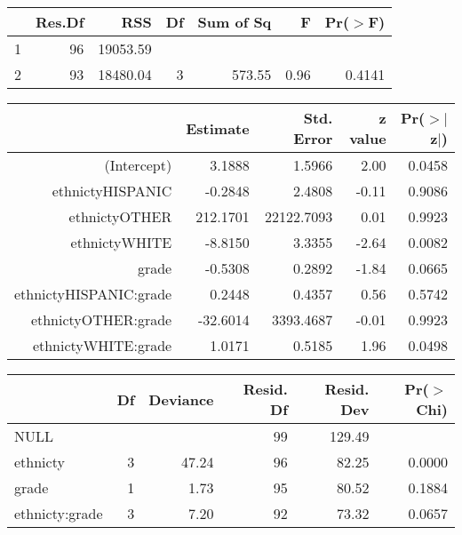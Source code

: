 \begin{table}[ht]
\centering
\begin{tabular}{lrrrrrr}
  \hline
 & Res.Df & RSS & Df & Sum of Sq & F & Pr($>$F) \\ 
  \hline
1 & 96 & 19053.59 &  &  &  &  \\ 
  2 & 93 & 18480.04 & 3 & 573.55 & 0.96 & 0.4141 \\ 
   \hline
\end{tabular}
\end{table}
\begin{table}[ht]
\centering
\begin{tabular}{rrrrr}
  \hline
 & Estimate & Std. Error & z value & Pr($>$$|$z$|$) \\ 
  \hline
(Intercept) & 3.1888 & 1.5966 & 2.00 & 0.0458 \\ 
  ethnictyHISPANIC & -0.2848 & 2.4808 & -0.11 & 0.9086 \\ 
  ethnictyOTHER & 212.1701 & 22122.7093 & 0.01 & 0.9923 \\ 
  ethnictyWHITE & -8.8150 & 3.3355 & -2.64 & 0.0082 \\ 
  grade & -0.5308 & 0.2892 & -1.84 & 0.0665 \\ 
  ethnictyHISPANIC:grade & 0.2448 & 0.4357 & 0.56 & 0.5742 \\ 
  ethnictyOTHER:grade & -32.6014 & 3393.4687 & -0.01 & 0.9923 \\ 
  ethnictyWHITE:grade & 1.0171 & 0.5185 & 1.96 & 0.0498 \\ 
   \hline
\end{tabular}
\end{table}
\begin{table}[ht]
\centering
\begin{tabular}{lrrrrr}
  \hline
 & Df & Deviance & Resid. Df & Resid. Dev & Pr($>$Chi) \\ 
  \hline
NULL &  &  & 99 & 129.49 &  \\ 
  ethnicty & 3 & 47.24 & 96 & 82.25 & 0.0000 \\ 
  grade & 1 & 1.73 & 95 & 80.52 & 0.1884 \\ 
  ethnicty:grade & 3 & 7.20 & 92 & 73.32 & 0.0657 \\ 
   \hline
\end{tabular}
\end{table}
